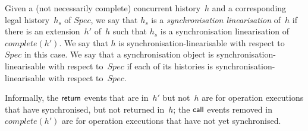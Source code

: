 \begin{definition}
\label{def:sync-lin-objects}
Given a (not necessarily complete) concurrent history~$h$ and a corresponding
legal history~$h_s$ of $Spec$, we say that $h_s$ is a \emph{synchronisation
  linearisation} of~$h$ if there is an extension~$h'$ of~$h$ such that $h_s$
is a synchronisation linearisation of $complete(h')$.
%
We say that $h$ is synchronisation-linearisable with respect to~$Spec$ in this
case.  We say that a synchronisation object is synchronisation-linearisable
with respect to~$Spec$ if each of its histories is
synchronisation-linearisable with respect to~$Spec$.
\end{definition}

Informally, the $\mbox{\sf{\small return}}$ events that are
in~$h'$ but not~$h$ are for operation executions that have synchronised, but
not returned in~$h$; the $\mbox{\sf{\small call}}$ events removed in $complete(h')$ are for
operation executions that have not yet synchronised.


